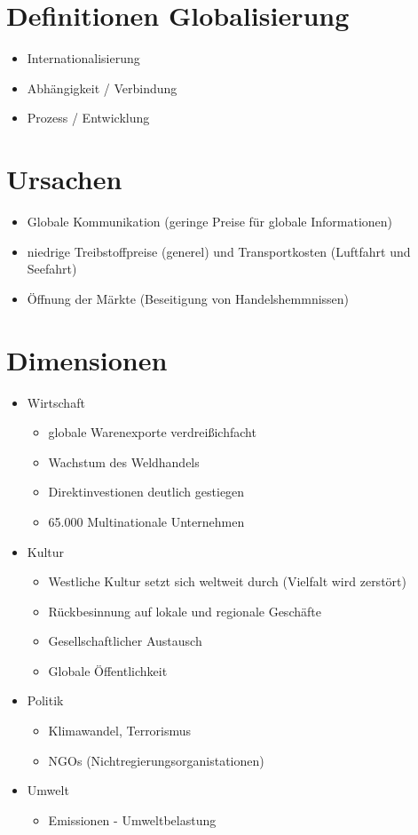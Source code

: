 \documentclass[12pt,a4paper]{report}
\begin{document}
	\section{Definitionen Globalisierung}
	\begin{itemize}
		\item Internationalisierung
		\item Abhängigkeit / Verbindung
		\item Prozess / Entwicklung
	\end{itemize}
	\section{Ursachen}
	\begin{itemize}
		\item Globale Kommunikation (geringe Preise für globale Informationen)
		\item niedrige Treibstoffpreise (generel) und Transportkosten (Luftfahrt und Seefahrt)
		\item Öffnung der Märkte (Beseitigung von Handelshemmnissen)
	\end{itemize}
	\section{Dimensionen}
	\begin{itemize}
		\item Wirtschaft
		\begin{itemize}
			\item globale Warenexporte verdreißichfacht
			\item Wachstum des Weldhandels
			\item Direktinvestionen deutlich gestiegen
			\item 65.000 Multinationale Unternehmen
		\end{itemize}
		\item Kultur
		\begin{itemize}
			\item Westliche Kultur setzt sich weltweit durch (Vielfalt wird zerstört)
			\item Rückbesinnung auf lokale und regionale Geschäfte
			\item Gesellschaftlicher Austausch
			\item Globale Öffentlichkeit
		\end{itemize}
		\item Politik
		\begin{itemize}
			\item Klimawandel, Terrorismus
			\item NGOs (Nichtregierungsorganistationen)
		\end{itemize}
		\item Umwelt
		\begin{itemize}
			\item Emissionen - Umweltbelastung
		\end{itemize}
	\end{itemize}
\end{document}
